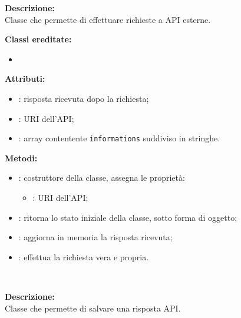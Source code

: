 \textbf{Descrizione:}\\
Classe che permette di effettuare richieste a API esterne.


\textbf{Classi ereditate:}
\begin{itemize}
	\item {}
\end{itemize}

\textbf{Attributi:}
\begin{itemize}
	\item {}: risposta ricevuta dopo la richiesta;
	\item {}: URI dell'API;
	\item {}: array contentente \texttt{informations} suddiviso in stringhe.
\end{itemize}

\textbf{Metodi:}
\begin{itemize}
	\item {}: costruttore della classe, assegna le proprietà:
	\begin{itemize}
		\item {}: URI dell'API;
	\end{itemize}
	\item {}: ritorna lo stato iniziale della classe, sotto forma di oggetto;
	\item {}: aggiorna in memoria la risposta ricevuta;
	\item {}: effettua la richiesta vera e propria.
\end{itemize}

\subsubparagraph[::ExternalAPIStore]{\class}\mbox{}\\ \label{\class}

\textbf{Descrizione:}\\
Classe che permette di salvare una risposta API.

